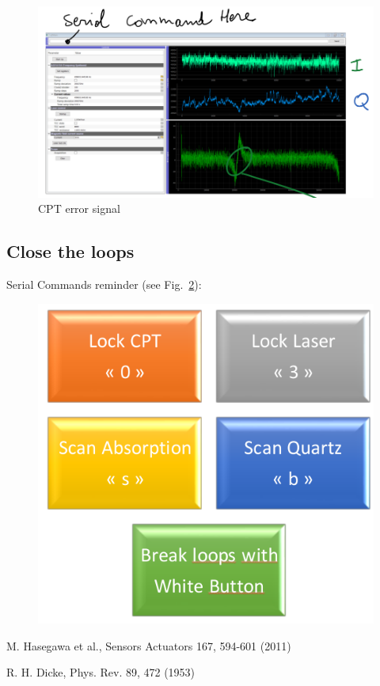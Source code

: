 \documentclass[a4paper,11pt]{article}
\begin{document}
\begin{figure}[h!]
	\centering
	\includegraphics[width=0.5\linewidth]{errorsignal}
	\caption{CPT error signal}
	\label{fig:errorsignal}
\end{figure}


\subsection{Close the loops}

Serial Commands reminder (see Fig.~\ref{fig:reminder}):
\begin{figure}[h!]
	\centering
	\includegraphics[width=0.5\linewidth]{reminder}
	\caption{}
	\label{fig:reminder}
\end{figure}





\begin{thebibliography}{9}
	
	M. Hasegawa et al., Sensors Actuators 167, 594-601 (2011)
	
	R. H. Dicke, Phys. Rev. 89, 472 (1953)
	
\end{thebibliography}
\end{document}
